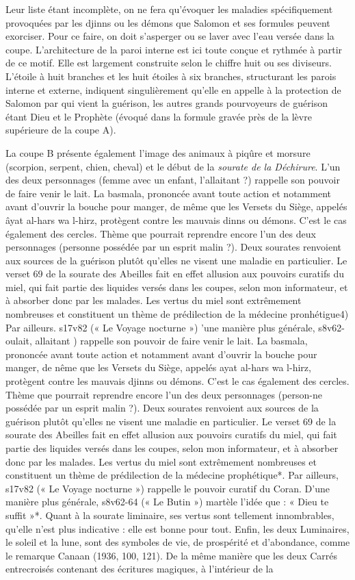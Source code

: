 Leur liste étant incomplète, on ne fera qu'évoquer les maladies spécifiquement provoquées par les djinns ou les démons que Salomon et ses formules peuvent exorciser. Pour ce faire, on doit s'asperger ou se laver avec l'eau versée dans la coupe. L'architecture de la paroi interne est ici toute conçue et rythmée à partir de ce motif. Elle est largement construite selon le chiffre huit ou ses diviseurs. L'étoile à huit branches et les huit étoiles à six branches, structurant les parois interne et externe, indiquent singulièrement qu'elle en appelle à la protection de Salomon par qui vient la guérison, les autres grands pourvoyeurs de guérison étant Dieu et le Prophète (évoqué dans la formule gravée près de la lèvre supérieure de la coupe A).


La coupe B présente également l'image des animaux à piqûre et morsure (scorpion, serpent, chien, cheval) et le début de la \textit{sourate de la Déchirure}. L'un des deux personnages (femme avec un enfant, l'allaitant ?) rappelle son pouvoir de faire venir le lait. La basmala, prononcée avant toute action et notamment avant d'ouvrir la bouche pour manger, de même que les Versets du Siège, appelés âyat al-hars wa l-hirz, protègent contre les mauvais dinns ou démons. C'est le cas également des cercles.
Thème que pourrait reprendre encore l'un des deux personnages (personne possédée par un esprit malin ?). Deux sourates renvoient aux sources de la guérison plutôt qu'elles ne visent une maladie en particulier. Le verset 69 de la sourate des Abeilles fait en effet allusion aux pouvoirs curatifs du miel, qui fait partie des liquides versés dans les coupes, selon mon informateur, et à absorber donc par les malades. Les vertus du miel sont extrêmement nombreuses et constituent un thème de prédilection de la médecine pronhétigue4) Par ailleurs. s17v82 (« Le Voyage nocturne »)
'une manière plus générale, s8v62-oulait, allaitant
) rappelle son pouvoir de faire venir le lait. La basmala, prononcée avant toute action et notamment avant d'ouvrir la bouche pour manger, de nême que les Versets du Siège, appelés ayat al-hars wa l-hirz, protègent contre les mauvais djinns ou démons. C'est le cas également des cercles.
Thème que pourrait reprendre encore l'un des deux personnages (person-ne possédée par un esprit malin ?). Deux sourates renvoient aux sources de la guérison plutôt qu'elles ne visent une maladie en particulier. Le verset 69 de la sourate des Abeilles fait en effet allusion aux pouvoirs curatifs du miel, qui fait partie des liquides versés dans les coupes, selon mon informateur, et à absorber donc par les malades. Les vertus du miel sont extrêmement nombreuses et constituent un thème de prédilection de la médecine prophétique*. Par ailleurs, s17v82 (« Le Voyage nocturne ») rappelle le pouvoir curatif du Coran. D'une manière plus générale, s8v62-64 (« Le Butin ») martèle l'idée que : « Dieu te suffit »*. Quant à la sourate liminaire, ses vertus sont tellement innombrables, qu'elle n'est plus indicative : elle est bonne pour tout. Enfin, les deux Luminaires, le soleil et la lune, sont des symboles de vie, de prospérité et d'abondance, comme le remarque Canaan (1936, 100, 121). De la même manière que les deux Carrés entrecroisés contenant des écritures magiques, à l'intérieur de la
